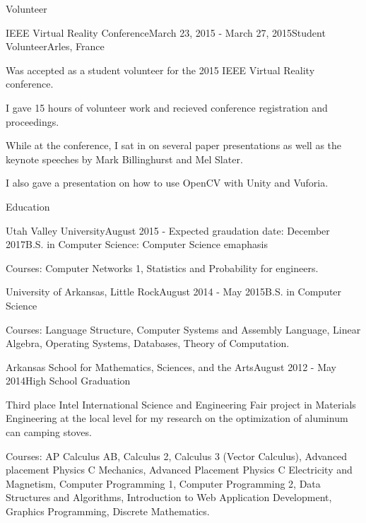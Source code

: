 \documentclass{resume} %
\begin{document}
\begin{rSection}{Volunteer}

	\begin{rSubsection}{IEEE Virtual Reality Conference}{March 23, 2015 - March 27, 2015}{Student Volunteer}{Arles, France}
		\item Was accepted as a student volunteer for the 2015 IEEE Virtual Reality conference.
		\item I gave 15 hours of volunteer work and recieved conference registration and proceedings.
		\item While at the conference, I sat in on several paper presentations as well as the keynote speeches by Mark Billinghurst and Mel Slater.
		\item I also gave a presentation on how to use OpenCV with Unity and Vuforia.
	\end{rSubsection}

\end{rSection}


\begin{rSection}{Education}

\begin{rSubsection}{Utah Valley University}{August 2015 - Expected graudation date: December 2017}{B.S. in Computer Science: Computer Science emaphasis}
	\item Courses: Computer Networks 1, Statistics and Probability for engineers.
\end{rSubsection}

\begin{rSubsection}{University of Arkansas, Little Rock}{August 2014 - May 2015}{B.S. in Computer Science}
	\item Courses: Language Structure, Computer Systems and Assembly Language, Linear Algebra, Operating Systems, Databases, Theory of Computation.
\end{rSubsection}

\begin{rSubsection}{Arkansas School for Mathematics, Sciences, and the Arts}{August 2012 - May 2014}{High School Graduation}
	\item Third place Intel International Science and Engineering Fair project in Materials Engineering at the local level for my research on the optimization of aluminum can camping stoves.
	\item Courses: AP Calculus AB, Calculus 2, Calculus 3 (Vector Calculus), Advanced placement Physics C Mechanics, Advanced Placement Physics C Electricity and Magnetism, Computer Programming 1, Computer Programming 2, Data Structures and Algorithms, Introduction to Web Application Development, Graphics Programming, Discrete Mathematics.
\end{rSubsection}

\end{rSection}
\end{document}
